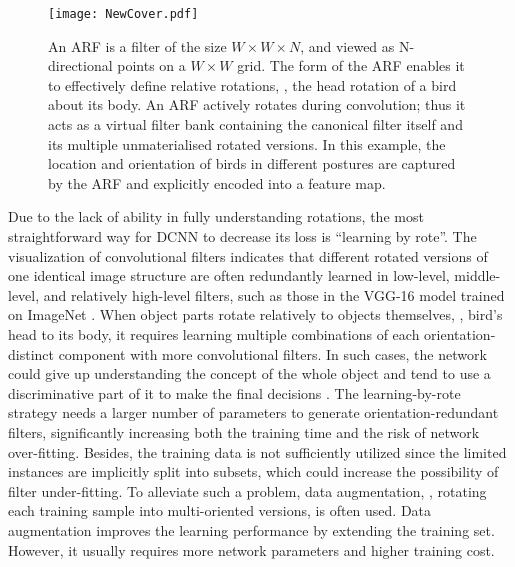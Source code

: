 \documentclass[10pt,twocolumn,letterpaper]{article}
\begin{document}
    \begin{figure}
        \begin{center}
           \texttt{[image: NewCover.pdf]}
        \end{center}
        \caption{
            An ARF is a filter of the size $W \times W\times N$, and viewed as N-directional points on a $W \times W$ grid.
            The form of the ARF enables it to effectively define relative rotations, \eg, the head rotation of a bird about its body.
            An ARF actively rotates during convolution; thus it acts as a virtual filter bank containing the canonical filter itself and its multiple unmaterialised rotated versions.
            In this example, the location and orientation of birds in different postures are captured by the ARF and explicitly encoded into a feature map.
        }
    \label{fig:cover}
    \vspace{-0.8em}
    \end{figure}

    Due to the lack of ability in fully understanding rotations, the most straightforward way for DCNN to decrease its loss is ``learning by rote''. The visualization of convolutional filters \cite{Erhan2009, Zeiler2014} indicates that different rotated versions of one identical image structure are often redundantly learned in low-level, middle-level, and relatively high-level filters, such as those in the VGG-16 model trained on ImageNet \cite{Deng2009}. When object parts rotate relatively to objects themselves, \eg, bird's head to its body, it requires learning multiple combinations of each orientation-distinct component with more convolutional filters. In such cases, the network could give up understanding the concept of the whole object and tend to use a discriminative part of it to make the final decisions \cite{Zhou2015}.
    The learning-by-rote strategy needs a larger number of parameters to generate orientation-redundant filters, significantly increasing both the training time and the risk of network over-fitting. Besides, the training data is not sufficiently utilized since the limited instances are implicitly split into subsets, which could increase the possibility of filter under-fitting. To alleviate such a problem, data augmentation, \eg, rotating each training sample into {multi-oriented versions}, is often used. Data augmentation improves the learning performance by extending the training set. However, it usually requires more network parameters and higher training cost.
\end{document}
